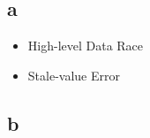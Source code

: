 \section{}
\subsection{a}
\begin{itemize}
    \item High-level Data Race
    \item Stale-value Error
\end{itemize}

\subsection{b}
